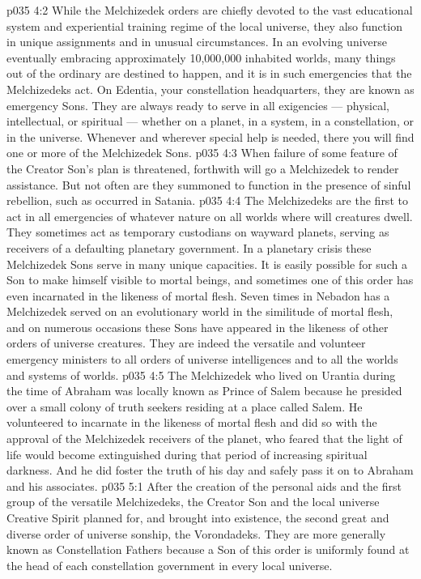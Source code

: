 \vs p035 4:2 \pc While the Melchizedek orders are chiefly devoted to the vast educational system and experiential training regime of the local universe, they also function in unique assignments and in unusual circumstances. In an evolving universe eventually embracing approximately 10,000,000 inhabited worlds, many things out of the ordinary are destined to happen, and it is in such emergencies that the Melchizedeks act. On Edentia, your constellation headquarters, they are known as emergency Sons. They are always ready to serve in all exigencies --- physical, intellectual, or spiritual --- whether on a planet, in a system, in a constellation, or in the universe. Whenever and wherever special help is needed, there you will find one or more of the Melchizedek Sons.
\vs p035 4:3 When failure of some feature of the Creator Son’s plan is threatened, forthwith will go a Melchizedek to render assistance. But not often are they summoned to function in the presence of sinful rebellion, such as occurred in Satania.
\vs p035 4:4 The Melchizedeks are the first to act in all emergencies of whatever nature on all worlds where will creatures dwell. They sometimes act as temporary custodians on wayward planets, serving as receivers of a defaulting planetary government. In a planetary crisis these Melchizedek Sons serve in many unique capacities. It is easily possible for such a Son to make himself visible to mortal beings, and sometimes one of this order has even incarnated in the likeness of mortal flesh. Seven times in Nebadon has a Melchizedek served on an evolutionary world in the similitude of mortal flesh, and on numerous occasions these Sons have appeared in the likeness of other orders of universe creatures. They are indeed the versatile and volunteer emergency ministers to all orders of universe intelligences and to all the worlds and systems of worlds.
\vs p035 4:5 \pc The Melchizedek who lived on Urantia during the time of Abraham was locally known as Prince of Salem because he presided over a small colony of truth seekers residing at a place called Salem. He volunteered to incarnate in the likeness of mortal flesh and did so with the approval of the Melchizedek receivers of the planet, who feared that the light of life would become extinguished during that period of increasing spiritual darkness. And he did foster the truth of his day and safely pass it on to Abraham and his associates.
\vs p035 5:1 After the creation of the personal aids and the first group of the versatile Melchizedeks, the Creator Son and the local universe Creative Spirit planned for, and brought into existence, the second great and diverse order of universe sonship, the Vorondadeks. They are more generally known as Constellation Fathers because a Son of this order is uniformly found at the head of each constellation government in every local universe.
